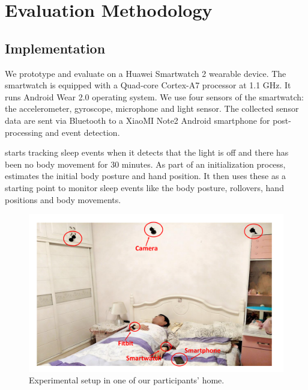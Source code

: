\section{Evaluation Methodology}
\subsection{Implementation}
We prototype and evaluate \systemname on a Huawei Smartwatch 2 wearable device. The smartwatch is equipped with a Quad-core Cortex-A7
processor at 1.1 GHz.  It runs Android Wear 2.0 operating system. We use four sensors of the smartwatch: the accelerometer, gyroscope,
microphone and light sensor. The collected sensor data are sent via Bluetooth to a XiaoMI Note2 Android smartphone for post-processing and
event detection.

\systemname starts tracking sleep events when it detects that the light is off and there has been no body movement for 30 minutes. As part
of an initialization process, \systemname estimates the initial body posture and hand position. It then uses these as a starting point to
monitor sleep events like the body posture, rollovers, hand positions and body movements.



\begin{figure}[!t]
	\centering
	\includegraphics[width=0.52\linewidth]{Figures/setup.pdf}
	\caption{Experimental setup in one of our participants' home. }\label{fig:setup}
\end{figure}



